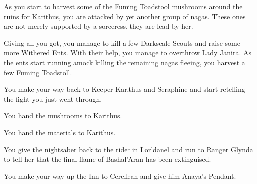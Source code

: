 As you start to harvest some of the Fuming Toadstool mushrooms around the ruins for Karithus, you are attacked by yet another group of nagas. These ones are not merely supported by a sorceress, they are lead by her.


Giving all you got, you manage to kill a few Darkscale Scouts and raise some more Withered Ents. With their help, you manage to overthrow Lady Janira. As the ents start running amock killing the remaining nagas fleeing, you harvest a few Fuming Toadstoll.

You make your way back to Keeper Karithus and Seraphine and start retelling the fight you just went through.


You hand the mushrooms to Karithus.



You hand the materials to Karithus.



You give the nightsaber back to the rider in Lor'danel and run to Ranger Glynda to tell her that the final flame of Bashal'Aran has been extinguised.


You make your way up the Inn to Cerellean and give him Anaya's Pendant.


